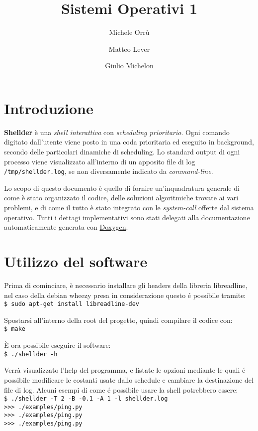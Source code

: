 \documentclass[11pt]{article}
\title{\textbf{Sistemi Operativi 1}}
\author{Michele Orr\`u \and Matteo Lever \and Giulio Michelon}
\date{}
\begin{document}
\newcommand{\code}{\texttt}

\maketitle

\section{Introduzione}

\textbf{Shellder} \`e una \emph{shell interattiva} con \emph{scheduling prioritario}.
Ogni comando digitato dall'utente viene posto in una coda prioritaria ed
eseguito in background, secondo delle particolari dinamiche di scheduling. Lo
standard output di ogni processo viene visualizzato all'interno di un apposito
file di log \code{/tmp/shellder.log}, se non diversamente indicato da
\emph{command-line}.

Lo scopo di questo documento \`e quello di fornire un'inquadratura generale di
come \`e stato organizzato il codice, delle soluzioni algoritmiche trovate ai
vari problemi, e di come il tutto \`e stato integrato con le \emph{system-call}
offerte dal sistema operativo. Tutti i dettagi implementativi sono stati
delegati alla documentazione automaticamente generata con
\href{http://www.stack.nl/~dimitri/doxygen/}{Doxygen}.

\section{Utilizzo del software}
\label{usage}

Prima di cominciare, \`e necessario installare gli headers della libreria libreadline,
nel caso della debian wheezy presa in considerazione questo \'e possibile tramite:
\\ \code{\$ sudo apt-get install libreadline-dev}

\noindent Spostarsi all'interno della root del progetto, quindi compilare il codice con:
\\ \code{\$ make}

\noindent \`E ora possibile eseguire il software:
\\ \code{\$ ./shellder -h}

\noindent Verr\`a visualizzato l'help del programma, e listate le opzioni mediante le quali \'e
possibile modificare le costanti usate dallo schedule e cambiare la destinazione del file di log.
Alcuni esempi di come \'e possibile usare la shell potrebbero essere:
\\ \code{\$ ./shellder  -T 2  -B -0.1  -A 1  -l shellder.log}
\\ \code{>>> ./examples/ping.py }
\\ \code{>>> ./examples/ping.py }
\\ \code{>>> ./examples/ping.py }
\end{document}
